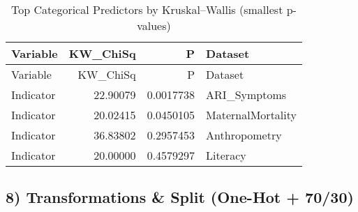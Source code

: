 \documentclass[
]{article}
\begin{document}
\begin{longtable}[]{@{}lrrl@{}}
\caption{Top Categorical Predictors by Kruskal--Wallis (smallest
p-values)}\tabularnewline
\toprule\noalign{}
Variable & KW\_ChiSq & P & Dataset \\
\midrule\noalign{}
\endfirsthead
\toprule\noalign{}
Variable & KW\_ChiSq & P & Dataset \\
\midrule\noalign{}
\endhead
\bottomrule\noalign{}
\endlastfoot
Indicator & 22.90079 & 0.0017738 & ARI\_Symptoms \\
Indicator & 20.02415 & 0.0450105 & MaternalMortality \\
Indicator & 36.83802 & 0.2957453 & Anthropometry \\
Indicator & 20.00000 & 0.4579297 & Literacy \\
\end{longtable}

\subsection{8) Transformations \& Split (One-Hot +
70/30)}\label{transformations-split-one-hot-7030}
\end{document}
